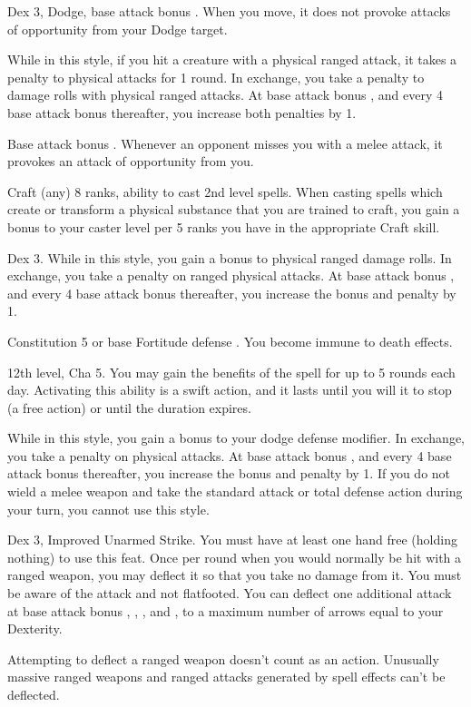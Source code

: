  Dex 3, Dodge, base attack bonus .
 When you move, it does not provoke attacks of opportunity from your Dodge target.

 While in this style, if you hit a creature with a physical ranged attack, it takes a  penalty to physical attacks for 1 round. In exchange, you take a  penalty to damage rolls with physical ranged attacks. At base attack bonus , and every 4 base attack bonus thereafter, you increase both penalties by 1.

\featpre Base attack bonus .
\featben Whenever an opponent misses you with a melee attack, it provokes an attack of opportunity from you.

\featpres Craft (any) 8 ranks, ability to cast 2nd level spells.
\featben When casting spells which create or transform a physical substance that you are trained to craft, you gain a  bonus to your caster level per 5 ranks you have in the appropriate Craft skill.

 Dex 3.
 While in this style, you gain a  bonus to physical ranged damage rolls. In exchange, you take a  penalty on ranged physical attacks. At base attack bonus , and every 4 base attack bonus thereafter, you increase the bonus and penalty by 1.

\featpre Constitution 5 or base Fortitude defense .
\featben You become immune to death effects.

\featpre 12th level, Cha 5.
\featben You may gain the benefits of the  spell for up to 5 rounds each day. Activating this ability is a swift action, and it lasts until you will it to stop (a free action) or until the duration expires.

 While in this style, you gain a  bonus to your dodge defense modifier. In exchange, you take a  penalty on physical attacks. At base attack bonus , and every 4 base attack bonus thereafter, you increase the bonus and penalty by 1. If you do not wield a melee weapon and take the standard attack or total defense action during your turn, you cannot use this style.

 Dex 3, Improved Unarmed Strike.
 You must have at least one hand free (holding nothing) to use this feat. Once per round when you would normally be hit with a ranged weapon, you may deflect it so that you take no damage from it. You must be aware of the attack and not flatfooted. You can deflect one additional attack at base attack bonus , , , and , to a maximum number of arrows equal to your Dexterity.
\par Attempting to deflect a ranged weapon doesn't count as an action. Unusually massive ranged weapons and ranged attacks generated by spell effects can't be deflected.

